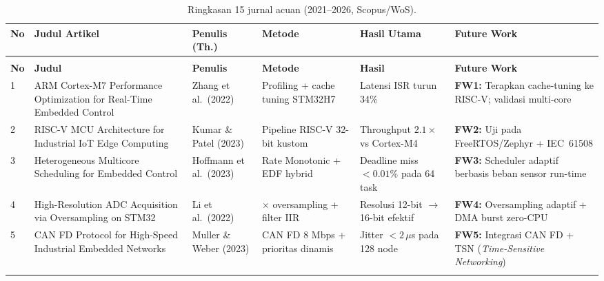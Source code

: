 \documentclass[12pt,a4paper]{article}
\begin{document}
\begingroup\small
\begin{longtable}{%
  @{} >{\centering\arraybackslash}p{0.35cm}
      >{\RaggedRight}p{3.0cm}
      >{\RaggedRight}p{1.7cm}
      >{\RaggedRight}p{2.2cm}
      >{\RaggedRight}p{2.2cm}
      >{\RaggedRight}p{3.3cm} @{}}
\caption{Ringkasan 15 jurnal acuan (2021--2026, Scopus/WoS).}
\label{tab:jurnal}\\
\toprule
\textbf{No} & \textbf{Judul Artikel} & \makecell[tl]{\textbf{Penulis}\\(\textbf{Th.})}
  & \textbf{Metode} & \textbf{Hasil Utama} & \textbf{Future Work}\\
\midrule\endfirsthead
\multicolumn{6}{c}{\small\itshape(lanjutan Tabel~\ref{tab:jurnal})}\\
\toprule
\textbf{No} & \textbf{Judul} & \textbf{Penulis}
  & \textbf{Metode} & \textbf{Hasil} & \textbf{Future Work}\\\midrule
\endhead\bottomrule\endfoot

1 & ARM Cortex-M7 Performance Optimization for Real-Time Embedded Control
  & Zhang et al.\ (2022) & Profiling + cache tuning STM32H7
  & Latensi ISR turun 34\%
  & \textbf{FW1:} Terapkan cache-tuning ke RISC-V; validasi multi-core\\
\addlinespace[3pt]

2 & RISC-V MCU Architecture for Industrial IoT Edge Computing
  & Kumar \& Patel (2023) & Pipeline RISC-V 32-bit kustom
  & Throughput $2.1\times$ vs Cortex-M4
  & \textbf{FW2:} Uji pada FreeRTOS/Zephyr + IEC~61508\\
\addlinespace[3pt]

3 & Heterogeneous Multicore Scheduling for Embedded Control
  & Hoffmann et al.\ (2023) & Rate Monotonic + EDF hybrid
  & Deadline miss $<0.01\%$ pada 64 task
  & \textbf{FW3:} Scheduler adaptif berbasis beban sensor run-time\\
\addlinespace[3pt]

4 & High-Resolution ADC Acquisition via Oversampling on STM32
  & Li et al.\ (2022) & 16$\times$ oversampling + filter IIR
  & Resolusi 12-bit $\to$ 16-bit efektif
  & \textbf{FW4:} Oversampling adaptif + DMA burst zero-CPU\\
\addlinespace[3pt]

5 & CAN FD Protocol for High-Speed Industrial Embedded Networks
  & Muller \& Weber (2023) & CAN FD 8 Mbps + prioritas dinamis
  & Jitter $<2\,\mu$s pada 128 node
  & \textbf{FW5:} Integrasi CAN FD + TSN (\textit{Time-Sensitive Networking})\\
\addlinespace[3pt]


\end{longtable}
\end{document}
